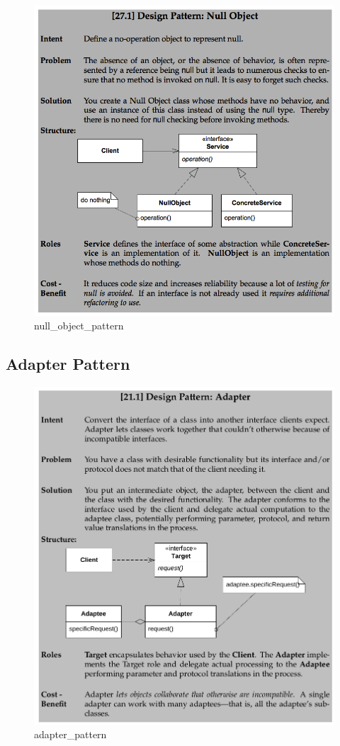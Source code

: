 \documentclass[11pt]{article}
\makeatletter
\def\maxwidth{\ifdim\Gin@nat@width>\linewidth\linewidth
    \else\Gin@nat@width\fi}
\let\Oldincludegraphics\includegraphics
\renewcommand{\includegraphics}[1]{\Oldincludegraphics[width=.8\maxwidth]{#1}}
\makeatother
\begin{document}
\begin{figure}
\centering
\includegraphics{img/null_object_pattern.png}
\caption{null\_object\_pattern}
\end{figure}

\hypertarget{adapter-pattern}{%
\subsection{Adapter Pattern}\label{adapter-pattern}}

\begin{figure}
\centering
\includegraphics{img/adapter_pattern.png}
\caption{adapter\_pattern}
\end{figure}
\end{document}
